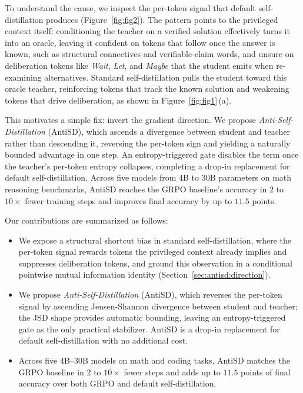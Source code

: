 \documentclass{article}
\begin{document}
To understand the cause, we inspect the per-token signal that default self-distillation produces (Figure~\ref{fig:fig2}). The pattern points to the privileged context itself: conditioning the teacher on a verified solution effectively turns it into an oracle, leaving it confident on tokens that follow once the answer is known, such as structural connectives and verifiable-claim words, and unsure on deliberation tokens like \emph{Wait}, \emph{Let}, and \emph{Maybe} that the student emits when re-examining alternatives. Standard self-distillation pulls the student toward this oracle teacher, reinforcing tokens that track the known solution and weakening tokens that drive deliberation, as shown in Figure~\ref{fig:fig1}\,(a).

This motivates a simple fix: invert the gradient direction. We propose \emph{Anti-Self-Distillation} (AntiSD), which ascends a divergence between student and teacher rather than descending it, reversing the per-token sign and yielding a naturally bounded advantage in one step. An entropy-triggered gate disables the term once the teacher's per-token entropy collapses, completing a drop-in replacement for default self-distillation. Across five models from 4B to 30B parameters on math reasoning benchmarks, AntiSD reaches the GRPO baseline's accuracy in $2$ to $10\times$ fewer training steps and improves final accuracy by up to $11.5$ points.

Our contributions are summarized as follows:
\begin{itemize}[leftmargin=10pt,itemsep=-1pt]
  \item We expose a structural shortcut bias in standard self-distillation, where the per-token signal rewards tokens the privileged context already implies and suppresses deliberation tokens, and ground this observation in a conditional pointwise mutual information identity (Section~\ref{sec:antisd:direction}).
  \item We propose \emph{Anti-Self-Distillation} (AntiSD), which reverses the per-token signal by ascending Jensen-Shannon divergence between student and teacher; the JSD shape provides automatic bounding, leaving an entropy-triggered gate as the only practical stabilizer. AntiSD is a drop-in replacement for default self-distillation with no additional cost.
  \item Across five 4B--30B models on math and coding tasks, AntiSD matches the GRPO baseline in $2$ to $10\times$ fewer steps and adds up to $11.5$ points of final accuracy over both GRPO and default self-distillation.
\end{itemize}
\end{document}
